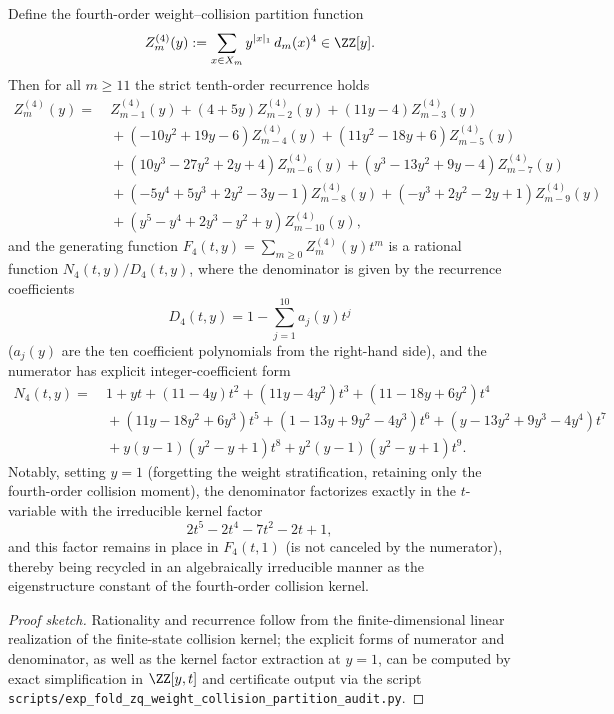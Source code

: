 \begin{conclusion}[Weight--collision partition function for \texorpdfstring{$(q=4)$}{(q=4)}: tenth-order recurrence and in-place recycling of the kernel polynomial]\label{con:xi-terminal-zm4-order10-rational}
Define the fourth-order weight--collision partition function
\[
Z_m^{(4)}(y):=\sum_{x\in X_m} y^{|x|_1}\,d_m(x)^4\in\ZZ[y].
\]
Then for all \(m\ge 11\) the strict tenth-order recurrence holds
\[
\begin{aligned}
Z_m^{(4)}(y)=&\ Z_{m-1}^{(4)}(y)+(4+5y)Z_{m-2}^{(4)}(y)+(11y-4)Z_{m-3}^{(4)}(y)\\
&\ +(-10y^2+19y-6)Z_{m-4}^{(4)}(y)+(11y^2-18y+6)Z_{m-5}^{(4)}(y)\\
&\ +(10y^3-27y^2+2y+4)Z_{m-6}^{(4)}(y)+(y^3-13y^2+9y-4)Z_{m-7}^{(4)}(y)\\
&\ +(-5y^4+5y^3+2y^2-3y-1)Z_{m-8}^{(4)}(y)+(-y^3+2y^2-2y+1)Z_{m-9}^{(4)}(y)\\
&\ +(y^5-y^4+2y^3-y^2+y)Z_{m-10}^{(4)}(y),
\end{aligned}
\]
and the generating function \(F_4(t,y)=\sum_{m\ge 0}Z_m^{(4)}(y)t^m\) is a rational function \(N_4(t,y)/D_4(t,y)\), where the denominator is given by the recurrence coefficients
\[
D_4(t,y)=1-\sum_{j=1}^{10}a_j(y)t^j
\]
(\(a_j(y)\) are the ten coefficient polynomials from the right-hand side), and the numerator has explicit integer-coefficient form
\[
\begin{aligned}
N_4(t,y)=&\ 1+yt+(11-4y)t^2+(11y-4y^2)t^3+(11-18y+6y^2)t^4\\
&\ +(11y-18y^2+6y^3)t^5+(1-13y+9y^2-4y^3)t^6+(y-13y^2+9y^3-4y^4)t^7\\
&\ +y(y-1)(y^2-y+1)t^8+y^2(y-1)(y^2-y+1)t^9.
\end{aligned}
\]
Notably, setting \(y=1\) (forgetting the weight stratification, retaining only the fourth-order collision moment), the denominator factorizes exactly in the \(t\)-variable with the irreducible kernel factor
\[
2t^5-2t^4-7t^2-2t+1,
\]
and this factor remains in place in \(F_4(t,1)\) (is not canceled by the numerator), thereby being recycled in an algebraically irreducible manner as the eigenstructure constant of the fourth-order collision kernel.
\end{conclusion}
\begin{proof}[Proof sketch]
Rationality and recurrence follow from the finite-dimensional linear realization of the finite-state collision kernel;
the explicit forms of numerator and denominator, as well as the kernel factor extraction at \(y=1\), can be computed by exact simplification in \(\ZZ[y,t]\) and certificate output via the script
\texttt{scripts/exp\_fold\_zq\_weight\_collision\_partition\_audit.py}.
\end{proof}

